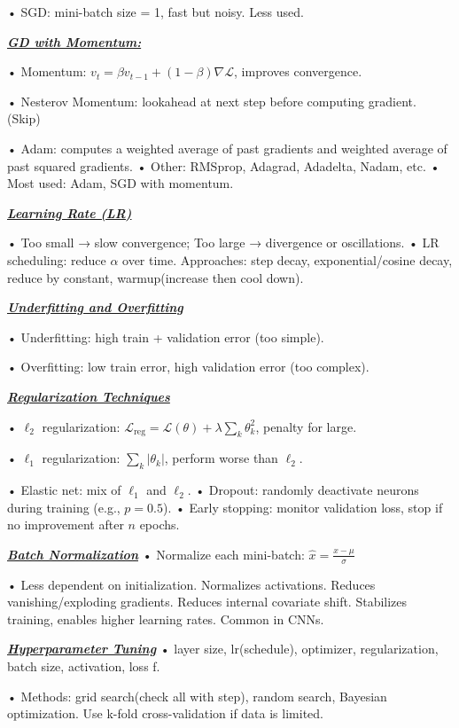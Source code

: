 \documentclass[10pt]{article}
\newcommand{\bulletPoint}[1]{\ul{\textit{\textbf{#1}}}}
\begin{document}
\begin{multicols*}{3}
• SGD: mini-batch size = 1, fast but noisy. Less used. 

\bulletPoint{GD with Momentum:}

• Momentum: $v_t = \beta v_{t-1} + (1-\beta) \nabla \mathcal{L}$, improves convergence. \quad

• Nesterov Momentum: lookahead at next step before computing gradient. (Skip)

• Adam: computes a weighted average of past gradients and weighted average of past squared gradients. 
• Other: RMSprop, Adagrad, Adadelta, Nadam, etc. 
• Most used: Adam, SGD with momentum.

\bulletPoint{Learning Rate (LR)} 

• Too small → slow convergence; Too large → divergence or oscillations. 
• LR scheduling: reduce $\alpha$ over time. 
Approaches: step decay, exponential/cosine decay, reduce by constant, warmup(increase then cool down).

\bulletPoint{Underfitting and Overfitting} 

• Underfitting: high train + validation error (too simple). 

• Overfitting: low train error, high validation error (too complex). 

\bulletPoint{Regularization Techniques} \quad

• $\ell_2$ regularization: $\mathcal{L}_{\text{reg}} = \mathcal{L}(\theta) + \lambda \sum_k \theta_k^2$, penalty for large.

• $\ell_1$ regularization: $\sum_k |\theta_k|$, perform worse than $\ell_2$. \quad

• Elastic net: mix of $\ell_1$ and $\ell_2$. \quad
• Dropout: randomly deactivate neurons during training (e.g., $p=0.5$). \quad
• Early stopping: monitor validation loss, stop if no improvement after $n$ epochs.

\bulletPoint{Batch Normalization} \quad
• Normalize each mini-batch: $\hat{x} = \frac{x - \mu}{\sigma}$ \quad

• Less dependent on initialization. Normalizes activations. Reduces vanishing/exploding gradients. Reduces internal covariate shift.
Stabilizes training, enables higher learning rates. Common in CNNs.

\bulletPoint{Hyperparameter Tuning} \quad
• layer size, lr(schedule), optimizer, regularization, batch size, activation, loss f. \quad

• Methods: grid search(check all with step), random search, Bayesian optimization. Use k-fold cross-validation if data is limited.


\end{multicols*}
\end{document}
